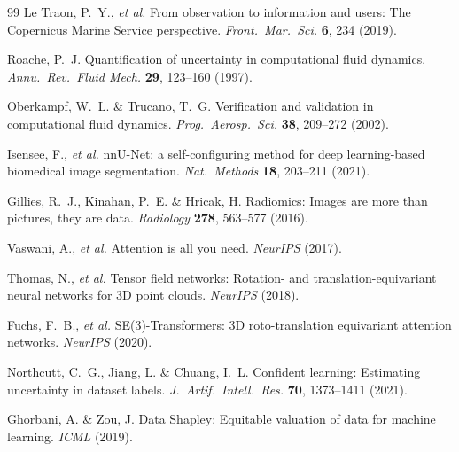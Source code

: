 \documentclass[12pt,a4paper]{article}
\begin{document}
\begin{thebibliography}{99}
Le Traon, P.\ Y., \emph{et al.} From observation to information and users: The Copernicus Marine Service perspective. \textit{Front.\ Mar.\ Sci.} \textbf{6}, 234 (2019).

Roache, P.\ J. Quantification of uncertainty in computational fluid dynamics. \textit{Annu.\ Rev.\ Fluid Mech.} \textbf{29}, 123--160 (1997).

Oberkampf, W.\ L. \& Trucano, T.\ G. Verification and validation in computational fluid dynamics. \textit{Prog.\ Aerosp.\ Sci.} \textbf{38}, 209--272 (2002).

Isensee, F., \emph{et al.} nnU-Net: a self-configuring method for deep learning-based biomedical image segmentation. \textit{Nat.\ Methods} \textbf{18}, 203--211 (2021).

Gillies, R.\ J., Kinahan, P.\ E. \& Hricak, H. Radiomics: Images are more than pictures, they are data. \textit{Radiology} \textbf{278}, 563--577 (2016).

Vaswani, A., \emph{et al.} Attention is all you need. \textit{NeurIPS} (2017).

Thomas, N., \emph{et al.} Tensor field networks: Rotation- and translation-equivariant neural networks for 3D point clouds. \textit{NeurIPS} (2018).

Fuchs, F.\ B., \emph{et al.} SE(3)-Transformers: 3D roto-translation equivariant attention networks. \textit{NeurIPS} (2020).

Northcutt, C.\ G., Jiang, L. \& Chuang, I.\ L. Confident learning: Estimating uncertainty in dataset labels. \textit{J.\ Artif.\ Intell.\ Res.} \textbf{70}, 1373--1411 (2021).

Ghorbani, A. \& Zou, J. Data Shapley: Equitable valuation of data for machine learning. \textit{ICML} (2019).

\end{thebibliography}
\end{document}
